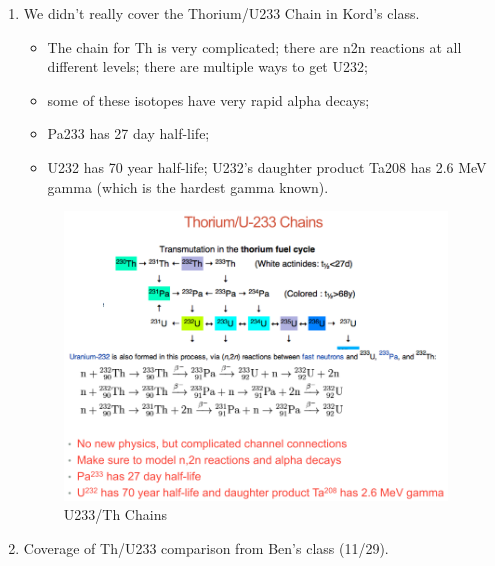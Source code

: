 \documentclass{school-22.211-notes}
\begin{document}
\clearpage
{}
\begin{enumerate}
 \item We didn't really cover the Thorium/U233 Chain in Kord's class. 
   \begin{itemize}
   \item The chain for Th is very complicated; there are n2n reactions
     at all different levels; there are multiple ways to get U232;
   \item some of these isotopes have very rapid alpha decays; 
   \item Pa233 has 27 day half-life; 
   \item U232 has 70 year half-life; U232's daughter product Ta208 has
     2.6 MeV gamma (which is the hardest gamma known).
   \end{itemize}
   \begin{figure}[h]
     \centering
     \includegraphics[width=4in]{images/dfs/Th-U-chains.png}
     \caption{U233/Th Chains} 
   \end{figure}


\item Coverage of Th/U233 comparison from Ben's class (11/29). 


\end{enumerate}
\end{document}
